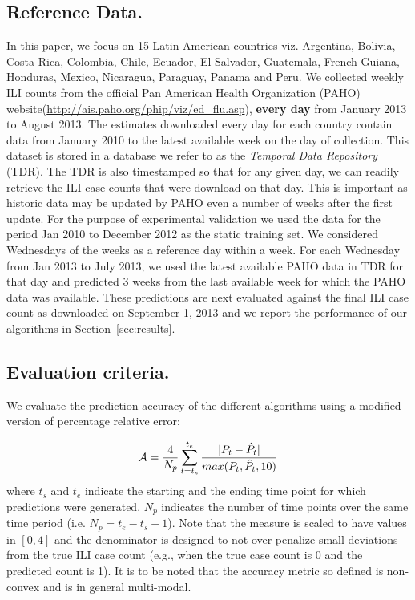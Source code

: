 
\subsection{Reference Data.}
In this paper, we focus on 15 Latin
American countries viz. Argentina, Bolivia, Costa Rica, Colombia, Chile,
Ecuador,  El Salvador, Guatemala, French Guiana, Honduras, Mexico, Nicaragua,
Paraguay, Panama and Peru. We collected weekly ILI counts
from the official Pan American Health Organization (PAHO)
website(\url{http://ais.paho.org/phip/viz/ed_flu.asp}), {\bf every day} from January 2013 to August 2013. The
estimates downloaded every day for each country contain data from January 2010 to the latest
available week on the day of collection. 
This dataset is stored in a database we refer to as
the {\it Temporal Data Repository} (TDR).  The TDR is also timestamped so that for
any given day, we can readily retrieve the ILI case
counts that were download on that day. This is important as historic data may be updated by
PAHO even a number of weeks after the first update.  For the purpose of experimental validation
we used the data for the period Jan 2010 to December 2012 as the static
training set. We considered Wednesdays of the weeks as a reference day within a week.  For
each Wednesday from Jan 2013 to July 2013, we used the latest available PAHO
data in TDR for that day and predicted 3 weeks from the last available week for
which the PAHO data was available. These predictions are next evaluated against
the final ILI case count as downloaded on September 1, 2013 and we report the
performance of our algorithms in Section~\ref{sec:results}. 

\subsection{Evaluation criteria.}
We evaluate the prediction accuracy of the
different algorithms using a modified version of percentage relative error:

\begin{equation} 
    \label{eq:def:accuracy} 
    \mathcal{A} = \frac{4}{N_p}\sum \limits_{t=t_s}^{t_e}\frac{|P_t -\hat{P}_t| }{max(P_t, \hat{P}_t, 10)}
    \vspace{-1em}
\end{equation} 
where $t_s$ and $t_e$ indicate the starting and the ending
time point for which predictions were generated.  $N_p$ indicates the number of
time points over the same time period (i.e. $N_p = t_e - t_s + 1$). Note that
the measure is scaled to have values in $[0,4]$ and the denominator is
designed to not over-penalize small deviations from the true ILI case count (e.g., when
the true case count is 0 and the predicted count is 1).
It is to be noted that the accuracy metric so defined is
non-convex and is in general multi-modal. 

